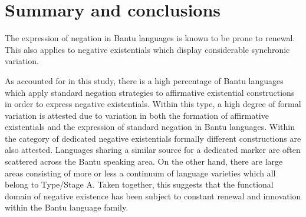\documentclass[output=paper]{langsci/langscibook}
\begin{document}
\section{Summary and conclusions}\label{sec:1:7}
%
The expression of negation in Bantu languages is known to be prone to renewal. This also applies to negative existentials which display considerable synchronic variation.

As accounted for in this study, there is a high percentage of Bantu
languages which apply standard negation strategies to affirmative
existential constructions in order to express negative existentials. Within
this type, a high degree of formal variation is attested due to variation
in both the formation of affirmative existentials and the expression of
standard negation in Bantu languages. Within the category of dedicated
negative existentials formally different constructions are also attested.
Languages sharing a similar source for a dedicated marker are often
scattered across the Bantu speaking area. On the other hand, there are
large areas consisting of more or less a continuum of language varieties
which all belong to Type\slash Stage A. Taken together, this suggests that the functional domain of negative existence has been subject to constant renewal and innovation within the Bantu language family.
\end{document}
